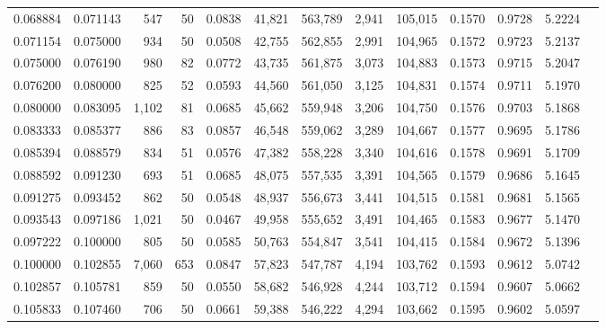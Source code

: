\begin{tabular}{rrrrrrrrrrrrr}
0.068884 & 0.071143 &    547 &    50 &                                     0.0838 &  41,821 & 563,789 &   2,941 & 105,015 & 0.1570 & 0.9728 & 5.2224 \\
0.071154 & 0.075000 &    934 &    50 &                                     0.0508 &  42,755 & 562,855 &   2,991 & 104,965 & 0.1572 & 0.9723 & 5.2137 \\
0.075000 & 0.076190 &    980 &    82 &                                     0.0772 &  43,735 & 561,875 &   3,073 & 104,883 & 0.1573 & 0.9715 & 5.2047 \\
0.076200 & 0.080000 &    825 &    52 &                                     0.0593 &  44,560 & 561,050 &   3,125 & 104,831 & 0.1574 & 0.9711 & 5.1970 \\
0.080000 & 0.083095 &  1,102 &    81 &                                     0.0685 &  45,662 & 559,948 &   3,206 & 104,750 & 0.1576 & 0.9703 & 5.1868 \\
0.083333 & 0.085377 &    886 &    83 &                                     0.0857 &  46,548 & 559,062 &   3,289 & 104,667 & 0.1577 & 0.9695 & 5.1786 \\
0.085394 & 0.088579 &    834 &    51 &                                     0.0576 &  47,382 & 558,228 &   3,340 & 104,616 & 0.1578 & 0.9691 & 5.1709 \\
0.088592 & 0.091230 &    693 &    51 &                                     0.0685 &  48,075 & 557,535 &   3,391 & 104,565 & 0.1579 & 0.9686 & 5.1645 \\
0.091275 & 0.093452 &    862 &    50 &                                     0.0548 &  48,937 & 556,673 &   3,441 & 104,515 & 0.1581 & 0.9681 & 5.1565 \\
0.093543 & 0.097186 &  1,021 &    50 &                                     0.0467 &  49,958 & 555,652 &   3,491 & 104,465 & 0.1583 & 0.9677 & 5.1470 \\
0.097222 & 0.100000 &    805 &    50 &                                     0.0585 &  50,763 & 554,847 &   3,541 & 104,415 & 0.1584 & 0.9672 & 5.1396 \\
0.100000 & 0.102855 &  7,060 &   653 &                                     0.0847 &  57,823 & 547,787 &   4,194 & 103,762 & 0.1593 & 0.9612 & 5.0742 \\
0.102857 & 0.105781 &    859 &    50 &                                     0.0550 &  58,682 & 546,928 &   4,244 & 103,712 & 0.1594 & 0.9607 & 5.0662 \\
0.105833 & 0.107460 &    706 &    50 &                                     0.0661 &  59,388 & 546,222 &   4,294 & 103,662 & 0.1595 & 0.9602 & 5.0597 \\

\end{tabular}
